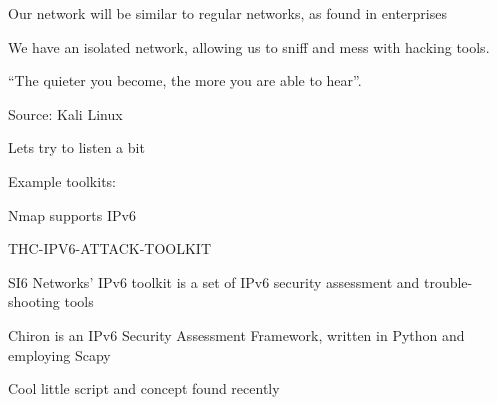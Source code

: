\documentclass[Screen16to9,17pt]{foils}
\begin{document}




\begin{list1}
\item Our network will be similar to regular networks, as found in enterprises
\item We have an isolated network, allowing us to sniff and mess with hacking tools.
\end{list1}




\centerline{“The quieter you become, the more you are able to hear”.}
Source: Kali Linux

\begin{list2}
\item Lets try to listen a bit
\end{list2}




\begin{quote}

\end{quote}

Example toolkits:
\begin{list2}
\item Nmap supports IPv6 
\item THC-IPV6-ATTACK-TOOLKIT 
\item SI6 Networks’ IPv6 toolkit is a set of IPv6 security assessment and trouble-shooting tools\\

\item Chiron is an IPv6 Security Assessment Framework, written in Python and employing Scapy\\

\item Cool little script and concept found recently 
\end{list2}

\end{document}
